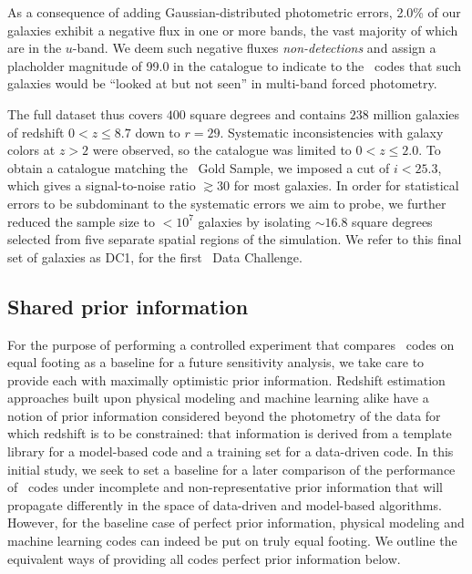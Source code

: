 As a consequence of adding Gaussian-distributed photometric errors, 2.0\% of our galaxies exhibit a negative flux in one or more bands, the vast majority of which are in the $u$-band.
We deem such negative fluxes \textit{non-detections} and assign a placholder magnitude of 99.0 in the catalogue to indicate to the \pzpdf\ codes that such galaxies would be ``looked at but not seen'' in multi-band forced photometry.

The full dataset thus covers $400$ square degrees and contains $238$ million galaxies of redshift $0 < z \leq 8.7$ down to $r = 29$.
Systematic inconsistencies with galaxy colors at $z > 2$ were observed, so the catalogue was limited to $0 < z \leq 2.0$.
To obtain a catalogue matching the \lsst\ Gold Sample, we imposed a cut of $i < 25.3$, which gives a signal-to-noise ratio $\gtrsim 30$ for most galaxies.
In order for statistical errors to be subdominant to the systematic errors we aim to probe, we further reduced the sample size to $<10^{7}$ galaxies by isolating $\sim 16.8$ square degrees selected from five separate spatial regions of the simulation.
We refer to this final set of galaxies as DC1, for the first \lsstdesc\ Data Challenge.

\subsection{Shared prior information}
\label{sec:controlled}

For the purpose of performing a controlled experiment that compares \pzpdf\ codes on equal footing as a baseline for a future sensitivity analysis, we take care to provide each with maximally optimistic prior information.
Redshift estimation approaches built upon physical modeling and machine learning alike have a notion of prior information considered beyond the photometry of the data for which redshift is to be constrained: that information is derived from a template library for a model-based code and a training set for a data-driven code.
In this initial study, we seek to set a baseline for a later comparison of the performance of \pzpdf\ codes under incomplete and non-representative prior information that will propagate differently in the space of data-driven and model-based algorithms.
However, for the baseline case of perfect prior information, physical modeling and machine learning codes can indeed be put on truly equal footing.
We outline the equivalent ways of providing all codes perfect prior information below.

